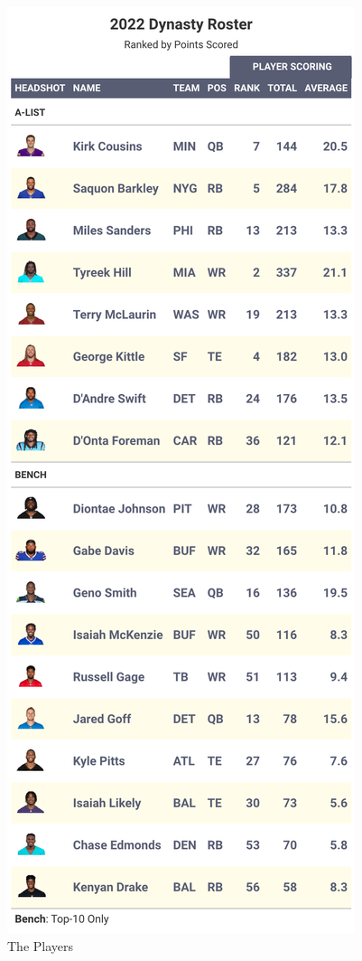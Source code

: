 \documentclass[
]{article}
\begin{document}
\begin{figure}
\includegraphics[width=0.75\linewidth,height=0.75\textheight]{output/2022/dynasty_roster_Ttsao} \caption{The Players}\label{fig:unnamed-chunk-33}
\end{figure}
\newpage
\end{document}
